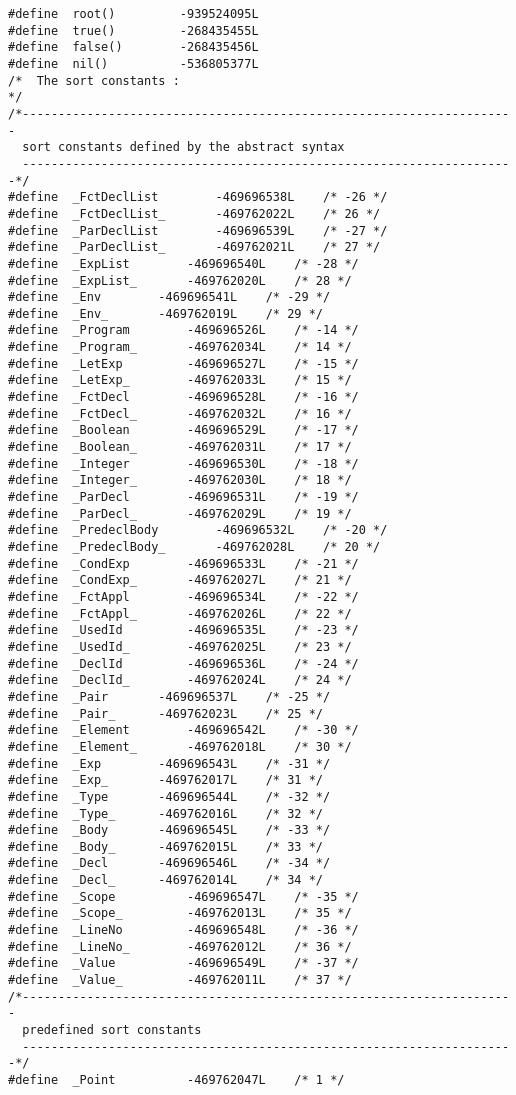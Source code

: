 \begin{verbatim}
#define  root()         -939524095L
#define  true()         -268435455L
#define  false()        -268435456L
#define  nil()          -536805377L
/*  The sort constants :                                                  */
/*---------------------------------------------------------------------
  sort constants defined by the abstract syntax
  ---------------------------------------------------------------------*/
#define  _FctDeclList 		 -469696538L	/* -26 */
#define  _FctDeclList_		 -469762022L	/* 26 */
#define  _ParDeclList 		 -469696539L	/* -27 */
#define  _ParDeclList_		 -469762021L	/* 27 */
#define  _ExpList 		 -469696540L	/* -28 */
#define  _ExpList_		 -469762020L	/* 28 */
#define  _Env 		 -469696541L	/* -29 */
#define  _Env_		 -469762019L	/* 29 */
#define  _Program 		 -469696526L	/* -14 */
#define  _Program_		 -469762034L	/* 14 */
#define  _LetExp 		 -469696527L	/* -15 */
#define  _LetExp_		 -469762033L	/* 15 */
#define  _FctDecl 		 -469696528L	/* -16 */
#define  _FctDecl_		 -469762032L	/* 16 */
#define  _Boolean 		 -469696529L	/* -17 */
#define  _Boolean_		 -469762031L	/* 17 */
#define  _Integer 		 -469696530L	/* -18 */
#define  _Integer_		 -469762030L	/* 18 */
#define  _ParDecl 		 -469696531L	/* -19 */
#define  _ParDecl_		 -469762029L	/* 19 */
#define  _PredeclBody 		 -469696532L	/* -20 */
#define  _PredeclBody_		 -469762028L	/* 20 */
#define  _CondExp 		 -469696533L	/* -21 */
#define  _CondExp_		 -469762027L	/* 21 */
#define  _FctAppl 		 -469696534L	/* -22 */
#define  _FctAppl_		 -469762026L	/* 22 */
#define  _UsedId 		 -469696535L	/* -23 */
#define  _UsedId_		 -469762025L	/* 23 */
#define  _DeclId 		 -469696536L	/* -24 */
#define  _DeclId_		 -469762024L	/* 24 */
#define  _Pair 		 -469696537L	/* -25 */
#define  _Pair_		 -469762023L	/* 25 */
#define  _Element 		 -469696542L	/* -30 */
#define  _Element_		 -469762018L	/* 30 */
#define  _Exp 		 -469696543L	/* -31 */
#define  _Exp_		 -469762017L	/* 31 */
#define  _Type 		 -469696544L	/* -32 */
#define  _Type_		 -469762016L	/* 32 */
#define  _Body 		 -469696545L	/* -33 */
#define  _Body_		 -469762015L	/* 33 */
#define  _Decl 		 -469696546L	/* -34 */
#define  _Decl_		 -469762014L	/* 34 */
#define  _Scope 		 -469696547L	/* -35 */
#define  _Scope_		 -469762013L	/* 35 */
#define  _LineNo 		 -469696548L	/* -36 */
#define  _LineNo_		 -469762012L	/* 36 */
#define  _Value 		 -469696549L	/* -37 */
#define  _Value_		 -469762011L	/* 37 */
/*---------------------------------------------------------------------
  predefined sort constants
  ---------------------------------------------------------------------*/
#define  _Point 		 -469762047L	/* 1 */

\end{verbatim}
